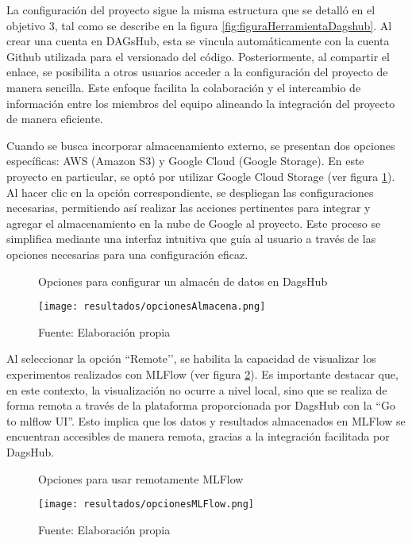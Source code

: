 La configuración del proyecto sigue la misma estructura que se detalló en el objetivo 3, tal como se describe en la figura \ref{fig:figuraHerramientaDagshub}. Al crear una cuenta en DAGsHub, esta se vincula automáticamente con la cuenta Github utilizada para el versionado del código. Posteriormente, al compartir el enlace, se posibilita a otros usuarios acceder a la configuración del proyecto de manera sencilla. Este enfoque facilita la colaboración y el intercambio de información entre los miembros del equipo alineando la integración del proyecto de manera eficiente. \newline

Cuando se busca incorporar almacenamiento externo, se presentan dos opciones específicas: AWS (Amazon S3) y Google Cloud (Google Storage). En este proyecto en particular, se optó por utilizar Google Cloud Storage (ver figura \ref{fig:figuraOpcionesAlmacena}). Al hacer clic en la opción correspondiente, se despliegan las configuraciones necesarias, permitiendo así realizar las acciones pertinentes para integrar y agregar el almacenamiento en la nube de Google al proyecto. Este proceso se simplifica mediante una interfaz intuitiva que guía al usuario a través de las opciones necesarias para una configuración eficaz.

\begin{figure}[h]
\centering
\caption{Opciones para configurar un almacén de datos en DagsHub}
\texttt{[image: resultados/opcionesAlmacena.png]}
\caption*{\footnotesize Fuente: Elaboración propia}
\label{fig:figuraOpcionesAlmacena}
\end{figure}

\newpage

Al seleccionar la opción ``Remote’’, se habilita la capacidad de visualizar los experimentos realizados con MLFlow (ver figura \ref{fig:figuraOpcionesMLFlow}). Es importante destacar que, en este contexto, la visualización no ocurre a nivel local, sino que se realiza de forma remota a través de la plataforma proporcionada por DagsHub con la “Go to mlflow UI”. Esto implica que los datos y resultados almacenados en MLFlow se encuentran accesibles de manera remota, gracias a la integración facilitada por DagsHub.


\begin{figure}[h]
\centering
\caption{Opciones para usar remotamente MLFlow}
\texttt{[image: resultados/opcionesMLFlow.png]}
\caption*{\footnotesize Fuente: Elaboración propia}
\label{fig:figuraOpcionesMLFlow}
\end{figure}

